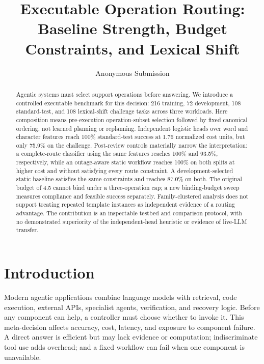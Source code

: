 \documentclass[letterpaper]{article} %
\title{Executable Operation Routing: Baseline Strength, Budget Constraints, and Lexical Shift}
\author{Anonymous Submission}
\begin{document}
\maketitle

\begin{abstract}
Agentic systems must select support operations before answering. We introduce a controlled executable benchmark for this decision: 216 training, 72 development, 108 standard-test, and 108 lexical-shift challenge tasks across three workloads. Here composition means pre-execution operation-subset selection followed by fixed canonical ordering, not learned planning or replanning. Independent logistic heads over word and character features reach 100\% standard-test success at 1.76 normalized cost units, but only 75.9\% on the challenge. Post-review controls materially narrow the interpretation: a complete-route classifier using the same features reaches 100\% and 93.5\%, respectively, while an outage-aware static workflow reaches 100\% on both splits at higher cost and without satisfying every route constraint. A development-selected static baseline satisfies the same constraints and reaches 87.0\% on both. The original budget of 4.5 cannot bind under a three-operation cap; a new binding-budget sweep measures compliance and feasible success separately. Family-clustered analysis does not support treating repeated template instances as independent evidence of a routing advantage. The contribution is an inspectable testbed and comparison protocol, with no demonstrated superiority of the independent-head heuristic or evidence of live-LLM transfer.
\end{abstract}


\section{Introduction}

Modern agentic applications combine language models with retrieval, code execution, external APIs, specialist agents, verification, and recovery logic. Before any component can help, a controller must choose whether to invoke it. This meta-decision affects accuracy, cost, latency, and exposure to component failure. A direct answer is efficient but may lack evidence or computation; indiscriminate tool use adds overhead; and a fixed workflow can fail when one component is unavailable.
\end{document}
